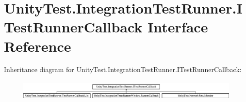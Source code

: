 \hypertarget{interface_unity_test_1_1_integration_test_runner_1_1_i_test_runner_callback}{}\section{Unity\+Test.\+Integration\+Test\+Runner.\+I\+Test\+Runner\+Callback Interface Reference}
\label{interface_unity_test_1_1_integration_test_runner_1_1_i_test_runner_callback}
Inheritance diagram for Unity\+Test.\+Integration\+Test\+Runner.\+I\+Test\+Runner\+Callback\+:\begin{figure}[H]
\begin{center}
\leavevmode
\includegraphics[height=1.091618cm]{interface_unity_test_1_1_integration_test_runner_1_1_i_test_runner_callback}
\end{center}
\end{figure}
